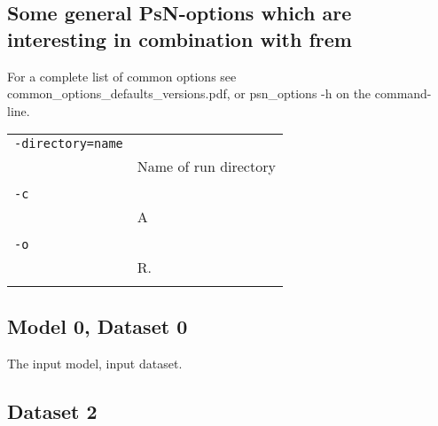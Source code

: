 \documentclass[a4paper,12pt]{article}
\begin{document}
\subsection{Some general PsN-options which are interesting in combination with frem}
For a complete list of common options see common\_options\_defaults\_versions.pdf, or psn\_options -h on the command-line.

\begin{longtable}{p{1in}p{4in}}
\verb|-directory=name| & \\
\nopagebreak
 & Name of run directory \\
\\
\verb|-c| & \\
\nopagebreak
 & A \\
\\
\verb|-o| & \\
\nopagebreak
 & R. \\
\\
\end{longtable}


\subsection{Model 0, Dataset 0}
The input model, input dataset.

\subsection{Dataset 2}
\end{document}
